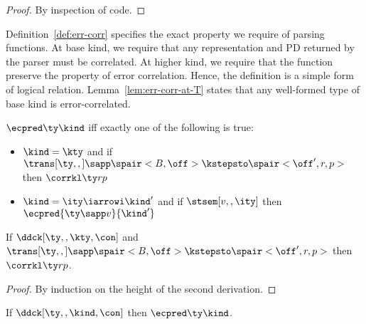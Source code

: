 {\begin{proof}
  By inspection of code. 
\end{proof}
}

Definition~\ref{def:err-corr} specifies the exact property we require
of parsing functions. At base kind, we require that any representation and PD
returned by the parser must be correlated. At higher kind, we require
that the function preserve the property of error correlation. Hence,
the definition is a simple form of logical relation.
Lemma~\ref{lem:err-corr-at-T} states that any well-formed type of base
kind is error-correlated.

\begin{definition}
\label{def:err-corr}
$\ecpred \ty \kind$ iff exactly one of the following is true:
  \begin{itemize}
  \item $\kind = \kty$ and if $\trans[\ty,,] \sapp \spair<B,\off> \kstepsto
  \spair<\off',r,p>$ then $\corrkl \ty r p$
  \item $\kind = \ity \iarrowi \kind'$ and if $\stsem[v,,\ity]$
    then $\ecpred {\ty \sapp v} {\kind'}$
  \end{itemize}
\end{definition}

\begin{lemma}
\label{lem:err-corr-at-T}
If $\ddck[\ty,,\kty,\con]$ and $\trans[\ty,,] \sapp \spair<B,\off> \kstepsto
  \spair<\off',r,p>$ then $\corrkl \ty r p$.
\end{lemma}

\begin{proof}
  By induction on the height of the second derivation.
\end{proof}

\begin{theorem}
\label{thm:err-corr}
If $\ddck[\ty,,\kind,\con]$ then $\ecpred \ty \kind$.
\end{theorem}


